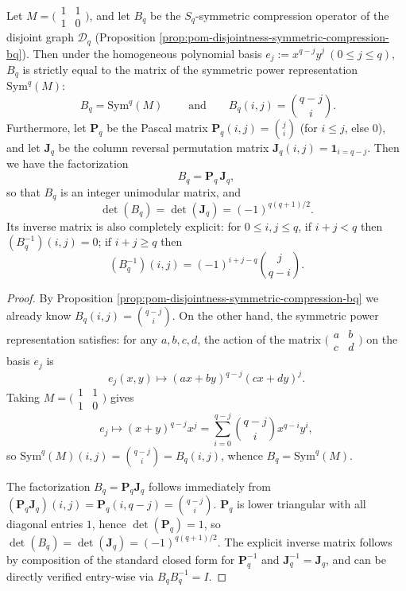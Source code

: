 \begin{conclusion}[\texorpdfstring{$S_q$}{Sq}-symmetric compression equals symmetric power representation: \texorpdfstring{$B_q=\mathrm{Sym}^q(M)$}{Bq=Sym^q(M)} and unimodular invertibility with explicit inverse]\label{con:xi-terminal-disjointness-bq-sympower-unimodular-inverse}
Let \(M=\bigl(\begin{smallmatrix}1&1\\[2pt]1&0\end{smallmatrix}\bigr)\), and let \(B_q\) be the \(S_q\)-symmetric compression operator of the disjoint graph \(\mathcal D_q\) (Proposition \ref{prop:pom-disjointness-symmetric-compression-bq}).
Then under the homogeneous polynomial basis
\(
e_j:=x^{q-j}y^j\ (0\le j\le q)
\),
\(B_q\) is strictly equal to the matrix of the symmetric power representation \(\mathrm{Sym}^q(M)\):
\[
\boxed{\;B_q=\mathrm{Sym}^q(M)\;}
\qquad\text{and}\qquad
B_q(i,j)=\binom{q-j}{i}.
\]
Furthermore, let \(\mathbf{P}_q\) be the Pascal matrix \(\mathbf{P}_q(i,j)=\binom{j}{i}\) (for \(i\le j\), else \(0\)), and let \(\mathbf{J}_q\) be the column reversal permutation matrix \(\mathbf{J}_q(i,j)=\mathbf{1}_{i=q-j}\).
Then we have the factorization
\[
B_q=\mathbf{P}_q\,\mathbf{J}_q,
\]
so that \(B_q\) is an integer unimodular matrix, and
\[
\det(B_q)=\det(\mathbf{J}_q)=(-1)^{q(q+1)/2}.
\]
Its inverse matrix is also completely explicit: for \(0\le i,j\le q\), if \(i+j<q\) then \((B_q^{-1})(i,j)=0\);
if \(i+j\ge q\) then
\[
(B_q^{-1})(i,j)=(-1)^{i+j-q}\binom{j}{q-i}.
\]
\end{conclusion}
\begin{proof}
By Proposition \ref{prop:pom-disjointness-symmetric-compression-bq} we already know \(B_q(i,j)=\binom{q-j}{i}\).
On the other hand, the symmetric power representation satisfies: for any \(a,b,c,d\), the action of the matrix \(\bigl(\begin{smallmatrix}a&b\\ c&d\end{smallmatrix}\bigr)\) on the basis \(e_j\) is
\[
e_j(x,y)\longmapsto (ax+by)^{q-j}(cx+dy)^j.
\]
Taking \(M=\bigl(\begin{smallmatrix}1&1\\ 1&0\end{smallmatrix}\bigr)\) gives
\[
e_j\longmapsto (x+y)^{q-j}x^j=\sum_{i=0}^{q-j}\binom{q-j}{i}x^{q-i}y^i,
\]
so \(\mathrm{Sym}^q(M)(i,j)=\binom{q-j}{i}=B_q(i,j)\), whence \(B_q=\mathrm{Sym}^q(M)\).
\par
The factorization \(B_q=\mathbf{P}_q\mathbf{J}_q\) follows immediately from
\((\mathbf{P}_q\mathbf{J}_q)(i,j)=\mathbf{P}_q(i,q-j)=\binom{q-j}{i}\).
\(\mathbf{P}_q\) is lower triangular with all diagonal entries \(1\), hence \(\det(\mathbf{P}_q)=1\), so \(\det(B_q)=\det(\mathbf{J}_q)=(-1)^{q(q+1)/2}\).
The explicit inverse matrix follows by composition of the standard closed form for \(\mathbf{P}_q^{-1}\) and \(\mathbf{J}_q^{-1}=\mathbf{J}_q\), and can be directly verified entry-wise via \(B_qB_q^{-1}=I\).
\end{proof}
